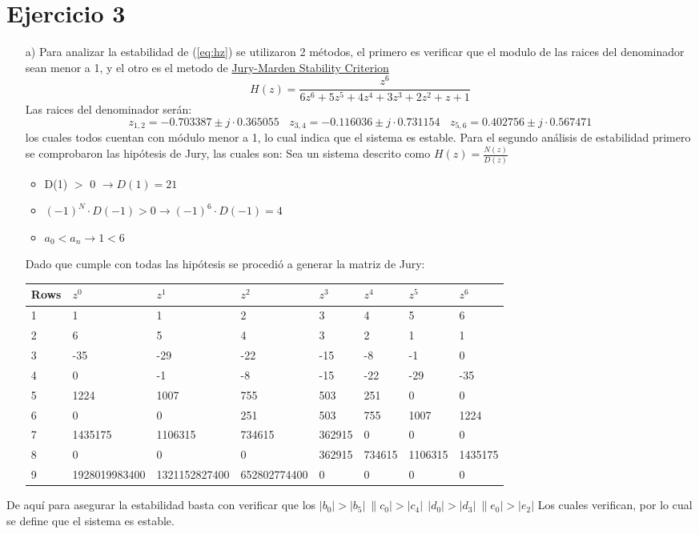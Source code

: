 \section*{Ejercicio 3}
\begin{itemize}
	\item[a)]
		Para analizar la estabilidad de (\ref{eq:hz}) se utilizaron 2 métodos, el primero es verificar que el modulo de las raices del denominador sean menor a 1, y el otro es el metodo de \href{https://en.wikibooks.org/wiki/Control_Systems/Jurys_Test}{Jury-Marden Stability Criterion}
		\begin{equation}
		H(z)=\frac{z^6}{6z^6+5z^5+4z^4+3z^3+2z^2+z+1}
		\label{eq:hz}
		\end{equation}
		Las raices del denominador serán:
		\begin{equation}
		z_{1,2}=-0.703387 \pm j \cdot 0.365055 \ \ \ \ 		z_{3,4}=-0.116036 \pm j\cdot  0.731154 \ \ \ \ z_{5,6}=0.402756 \pm j\cdot  0.567471
		\end{equation}
		los cuales todos cuentan con módulo menor a 1, lo cual indica que el sistema es estable.
		Para el segundo análisis de estabilidad
		primero se comprobaron las hipótesis de Jury, las cuales son:
		Sea un sistema descrito como $H(z) = \frac{N(z)}{D(z)}$
		\\
		\begin{itemize}
		\item D(1) $>$ 0 $\rightarrow D(1)=21$
				\item $(-1)^N \cdot D(-1) > 0 \rightarrow (-1)^6 \cdot D(-1)=4$
				\item $a_0 < a_n \rightarrow 1<6$
		\end{itemize}
		Dado que cumple con todas las hipótesis se procedió a generar la matriz de Jury:
		\begin{table}[H]
\centering
\begin{tabular}{llllllll}
\multicolumn{1}{c}{Rows} & $z^0$ & $z^1$ & $z^2$ & $z^3$ & $z^4$ & $z^5$ & $z^6$ \\ \hline
\multicolumn{1}{l|}{1} & 1 & 1 & 2 & 3 & 4 & 5 & 6 \\
\multicolumn{1}{l|}{2} & 6 & 5 & 4 & 3 & 2 & 1 & 1 \\
\multicolumn{1}{l|}{3} & -35 & -29 & -22 & -15 & -8 & -1 & 0 \\
\multicolumn{1}{l|}{4} & 0 & -1 & -8 & -15 & -22 & -29 & -35 \\
\multicolumn{1}{l|}{5} & 1224 & 1007 & 755 & 503 & 251 & 0 & 0 \\
\multicolumn{1}{l|}{6} & 0 & 0 & 251 & 503 & 755 & 1007 & 1224 \\
\multicolumn{1}{l|}{7} & 1435175 & 1106315 & 734615 & 362915 & 0 & 0 & 0 \\
\multicolumn{1}{l|}{8} & 0 & 0 & 0 & 362915 & 734615 & 1106315 & 1435175 \\
\multicolumn{1}{l|}{9} & 1928019983400 & 1321152827400 & 652802774400 & 0 & 0 & 0 & 0
\end{tabular}
\end{table}

\end{itemize}
De aquí para asegurar la estabilidad basta con verificar que los  $|b_0| > |b_{5}| \ \|c_0| > |c_{4}| \ \ |d_0| > |d_{3}| \ \|e_0| > |e_{2}|$
Los cuales verifican, por lo cual se define que el sistema es estable.


